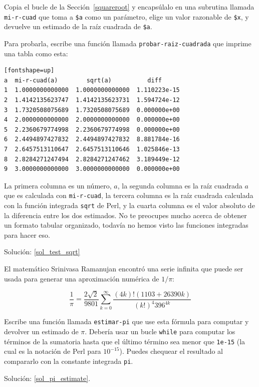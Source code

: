 \begin{exercise}
\label{test_sqrt}

Copia el bucle de la Sección~\ref{squareroot} y 
encapsúlalo en una subrutina llamada \verb|mi-r-cuad|
que toma a {\tt \$a} como un parámetro, elige un valor 
razonable de {\tt \$x}, y devuelve un estimado de la 
raíz cuadrada de {\tt \$a}.

Para probarla, escribe una función llamada \verb|probar-raiz-cuadrada|
que imprime una tabla como esta:

\begin{verbatim}[fontshape=up]
a  mi-r-cuad(a)        sqrt(a)          diff
1  1.0000000000000  1.0000000000000  1.110223e-15
2  1.4142135623747  1.4142135623731  1.594724e-12
3  1.7320508075689  1.7320508075689  0.000000e+00
4  2.0000000000000  2.0000000000000  0.000000e+00
5  2.2360679774998  2.2360679774998  0.000000e+00
6  2.4494897427832  2.4494897427832  8.881784e-16
7  2.6457513110647  2.6457513110646  1.025846e-13
8  2.8284271247494  2.8284271247462  3.189449e-12
9  3.0000000000000  3.0000000000000  0.000000e+00

\end{verbatim}
%
La primera columna es un número, $a$, la segunda columna
es la raíz cuadrada $a$ que es calculada con \verb|mi-r-cuad|,
la tercera columna es la raíz cuadrada calculada con la 
función integrada {\tt sqrt} de Perl, y la cuarta columna
es el valor absoluto de la diferencia entre los dos
estimados. No te preocupes mucho acerca de obtener un formato 
tabular organizado, todavía no hemos visto las funciones
integradas para hacer eso.

Solución: \ref{sol_test_sqrt}
%

\end{exercise}



\begin{exercise}
\label{pi_estimate}

El matemático Srinivasa Ramanujan encontró una serie infinita
que puede ser usada para generar una aproximación numérica
de $1 / \pi$:

\[ \frac{1}{\pi} = \frac{2\sqrt{2}}{9801} 
\sum^\infty_{k=0} \frac{(4k)!(1103+26390k)}{(k!)^4 396^{4k}} \]

Escribe una función llamada \verb|estimar-pi| que use 
esta fórmula para computar y devolver un estimado de $\pi$.
Debería usar un bucle {\tt while} para computar los términos
de la sumatoria hasta que el último término sea menor que 
{\tt 1e-15}  (la cual es la notación de Perl para $10^{-15}$).
Puedes chequear el resultado al compararlo con la constante
integrada {\tt pi}.

Solución: \ref{sol_pi_estimate}.

\end{exercise}

